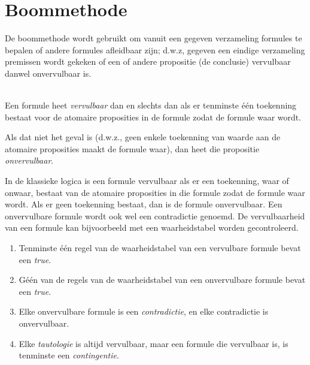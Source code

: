 \section{Boommethode}\label{sec:boom}
De boommethode wordt gebruikt om vanuit een gegeven verzameling formules te bepalen of andere formules afleidbaar zijn; d.w.z, gegeven een eindige verzameling premissen wordt gekeken of een of andere propositie (de conclusie) vervulbaar danwel onvervulbaar is.%

\begin{definition}\mbox{}\\
Een formule heet \textit{vervulbaar} dan en slechts dan als er tenminste \'e\'en toekenning bestaat voor de atomaire proposities in de formule zodat de formule waar wordt. 

Als dat niet het geval is (d.w.z., geen enkele toekenning van waarde aan de atomaire proposities maakt de formule waar), dan heet die propositie \textit{onvervulbaar}.
\end{definition}

In de klassieke logica is een formule vervulbaar als er een toekenning, waar of onwaar, bestaat van de atomaire proposities in die formule zodat de formule waar wordt. Als er geen toekenning bestaat, dan is de formule onvervulbaar. Een onvervulbare formule wordt ook wel een contradictie genoemd. De vervulbaarheid van een formule kan bijvoorbeeld met een waarheidstabel worden gecontroleerd.

\begin{corollary}\mbox{}
\begin{enumerate}
\item Tenminste \'e\'en regel van de waarheidstabel van een vervulbare formule bevat een \textit{true}.
\item G\'e\'en van de regels van de waarheidstabel van een onvervulbare formule bevat een \textit{true}.
\item Elke onvervulbare formule is een \textit{contradictie}, en elke contradictie is onvervulbaar.
\item Elke \textit{tautologie} is altijd vervulbaar, maar een formule die vervulbaar is, is tenminste een \textit{contingentie}.
\end{enumerate}
\end{corollary}

